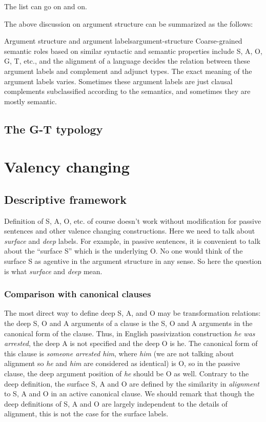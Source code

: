 \documentclass[UTF8, a4paper, oneside, scheme=plain]{ctexart}
\newcommand*{\term}[1]{\emph{#1}}
\newcommand*{\corpus}[1]{\emph{#1}}
\begin{document}
The list can go on and on.

The above discussion on argument structure can be summarized as the follows:
\begin{infobox}{Argument structure and argument labels}{argument-structure}
    Coarse-grained semantic roles based on similar syntactic and semantic properties 
    include S, A, O, G, T, etc.,
    and the alignment of a language decides 
    the relation between these argument labels
    and complement and adjunct types.
    The exact meaning of the argument labels varies.
    Sometimes these argument labels are just clausal complements subclassified 
    according to the semantics,
    and sometimes they are mostly semantic.
\end{infobox}

\subsection{The G-T typology}



\section{Valency changing}

\subsection{Descriptive framework}\label{sec:valency-changing-theory}

Definition of S, A, O, etc. of course doesn't work without modification
for passive sentences and other valence changing constructions. 
Here we need to talk about \term{surface} and \term{deep} labels.
For example, in passive sentences, 
it is convenient to talk about the ``surface S'' which is the underlying O. 
No one would think of the surface S as agentive in the argument structure in any sense. 
So here the question is what \term{surface} and \term{deep} mean.

\subsubsection{Comparison with canonical clauses}

The most direct way to define deep S, A, and O may be transformation relations: 
the deep S, O and A arguments of a clause is the S, O and A arguments in the canonical form of the clause.
Thus, in English passivization construction \corpus{he was arrested}, 
the deep A is not specified and the deep O is he. 
The canonical form of this clause is \corpus{someone arrested him}, 
where \corpus{him} 
(we are not talking about alignment so \corpus{he} and \corpus{him} are considered as identical) is O, 
so in the passive clause, 
the deep argument position of \corpus{he} should be O as well.
Contrary to the deep definition, 
the surface S, A and O are defined by the similarity in \emph{alignment} 
to S, A and O in an active canonical clause. 
We should remark that though the deep definitions of S, A and O are largely independent 
to the details of alignment, 
this is not the case for the surface labels.
\end{document}
